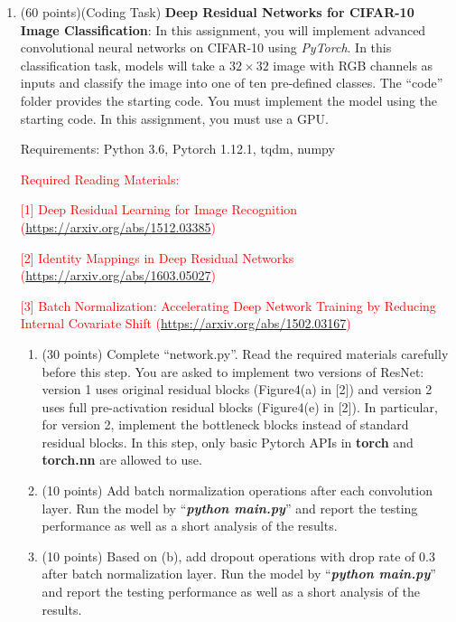\documentclass[11pt]{article}
\begin{document}
\begin{enumerate}
    \item (60 points)(Coding Task) \textbf{Deep Residual Networks for CIFAR-10 Image Classification}: In this assignment, you will implement advanced convolutional neural networks on CIFAR-10 using \textit{PyTorch}. In this classification task, models will take a $32 \times 32$ image with RGB channels as inputs and classify the image into one of ten pre-defined classes. The ``code'' folder provides the starting code. You must implement the model using the starting code. In this assignment, you must use a GPU.

    Requirements: Python 3.6, Pytorch 1.12.1, tqdm, numpy

    \textcolor{red}{Required Reading Materials:}

    \textcolor{red}{[1] Deep Residual Learning for Image Recognition (\url{https://arxiv.org/abs/1512.03385})}

    \textcolor{red}{[2] Identity Mappings in Deep Residual Networks (\url{https://arxiv.org/abs/1603.05027})}

    \textcolor{red}{[3] Batch Normalization: Accelerating Deep Network Training by Reducing Internal Covariate Shift (\url{https://arxiv.org/abs/1502.03167})}

    \begin{enumerate}
        \item (30 points) Complete ``network.py''. Read the required materials carefully before this step. You are asked to implement two versions of ResNet: version 1 uses original residual blocks (Figure4(a) in [2]) and version 2 uses full pre-activation residual blocks (Figure4(e) in [2]). In particular, for version 2, implement the bottleneck blocks instead of standard residual blocks. In this step, only basic Pytorch APIs in \textbf{torch} and \textbf{torch.nn} are allowed to use.

        \item (10 points) Add batch normalization operations after
        each convolution layer. Run the model by
        ``\emph{\textbf{python main.py}}'' and report the testing
        performance as well as a short analysis of the results.

        \item (10 points) Based on (b), add dropout operations with
        drop rate of 0.3 after batch normalization layer.
        Run the model by ``\emph{\textbf{python main.py}}'' and
        report the testing performance as well as a short analysis of
        the results.


\end{enumerate}
\end{enumerate}
\end{document}
